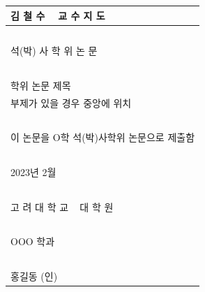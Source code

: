 \documentclass[11pt]{report}
\theoremstyle{plain}
\theoremstyle{definition}
\theoremstyle{corollary}
\theoremstyle{definition}
\theoremstyle{plain}
\theoremstyle{definition}
\theoremstyle{plain}
\begin{document}
\newpage
\noindent
\begin{tabularx}{\textwidth}{| >{\centering\arraybackslash}X |}
\arrayrulecolor{gray}
\hline
\Large 김 철 수 ~ 교 수 지 도 \\\hline
~\small\color{gray}{0.5cm 여백}\\\hline
\Large 석(박) 사 학 위 논 문 \\\hline
~\small\color{gray}{2-3cm 여백}\vspace{35pt}\\\hline %
\huge 학위 논문 제목\\
\Large 부제가 있을 경우 중앙에 위치\\
~\small\color{gray}{여백 조정 가능}\vspace{28pt}\\\hline 
\Large 이 논문을 O학 석(박)사학위 논문으로 제출함\\\hline
~\small\color{gray}{2-3cm 여백}\vspace{35pt}\\\hline %
\large 2023년 2월\\\hline
~\small\color{gray}{2-3cm 여백}\vspace{35pt}\\\hline %
\LARGE 고 려 대 학 교 ~ 대 학 원\\\hline %
~\small\color{gray}{0.5cm 여백}\\\hline
\Large OOO 학과 \\\hline
~\small\color{gray}{1cm 여백}\vspace{14pt}\\\hline %
\Large 홍길동 (인) \\\hline
\end{tabularx}
\end{document}

